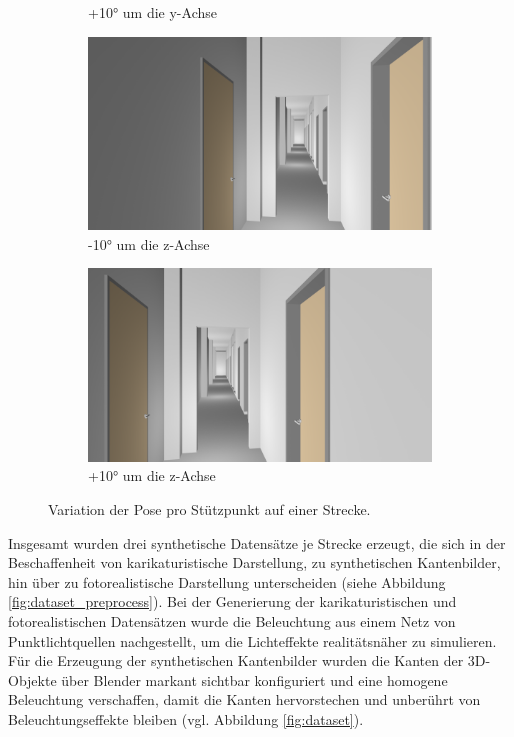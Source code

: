 \begin{figure}
\begin{subfigure}[t]{0.18\linewidth}
		\caption{+10° um die y-Achse}
		\label{subfig:iz0_y+10}
	\end{subfigure}
	\hfill
	\begin{subfigure}[t]{0.18\linewidth}
		\centering
		\includegraphics[width=\linewidth]{images/syn_dataset/00024.png}
		\caption{-10° um die z-Achse}
		\label{subfig:iz-10_y0}
	\end{subfigure}
	\hfill
	\begin{subfigure}[t]{0.18\linewidth}
		\centering
		\includegraphics[width=\linewidth]{images/syn_dataset/00022.png}
		\caption{+10° um die z-Achse}
		\label{subfig:iz+10_y0}
	\end{subfigure}
	\caption{Variation der Pose pro Stützpunkt auf einer Strecke.}
	\label{fig:dataset_variation}
\end{figure}

Insgesamt wurden drei synthetische Datensätze je Strecke erzeugt, die sich in der Beschaffenheit von karikaturistische Darstellung, zu synthetischen Kantenbilder, hin über zu fotorealistische Darstellung unterscheiden (siehe Abbildung \ref{fig:dataset_preprocess}). Bei der Generierung der karikaturistischen und fotorealistischen Datensätzen wurde die Beleuchtung aus einem Netz von Punktlichtquellen nachgestellt, um die Lichteffekte realitätsnäher zu simulieren.
Für die Erzeugung der synthetischen Kantenbilder wurden die Kanten der 3D-Objekte über Blender markant sichtbar konfiguriert und eine homogene Beleuchtung verschaffen, damit die Kanten hervorstechen und unberührt von Beleuchtungseffekte bleiben (vgl. Abbildung \ref{fig:dataset}). 

